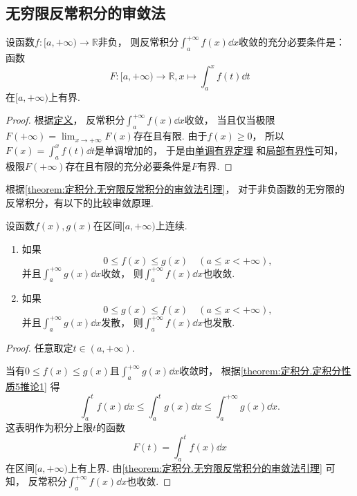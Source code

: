 \subsection{无穷限反常积分的审敛法}
\begin{theorem}\label{theorem:定积分.无穷限反常积分的审敛法引理}
设函数\(f\colon[a,+\infty)\to\mathbb{R}\)非负，
则反常积分\(\int_a^{+\infty} f(x) \dd{x}\)收敛的充分必要条件是：
函数\[
	F\colon[a,+\infty)\to\mathbb{R},
	x \mapsto \int_a^x f(t) \dd{t}
\]在\([a,+\infty)\)上有界.
\begin{proof}
根据\hyperref[definition:定积分.无穷限的反常积分的定义1]{定义}，
反常积分\(\int_a^{+\infty} f(x) \dd{x}\)收敛，
当且仅当极限\(F(+\infty) = \lim_{x\to+\infty} F(x)\)存在且有限.
由于\(f(x)\geq0\)，
所以\(F(x) = \int_a^x f(t) \dd{t}\)是单调增加的，
于是由\hyperref[theorem:极限.函数的单调有界定理]{单调有界定理}%
和\hyperref[theorem:极限.函数极限的局部有界性]{局部有界性}可知，
极限\(F(+\infty)\)存在且有限的充分必要条件是\(F\)有界.
\end{proof}
\end{theorem}

根据\cref{theorem:定积分.无穷限反常积分的审敛法引理}，
对于非负函数的无穷限的反常积分，有以下的比较审敛原理.
\begin{theorem}[比较审敛原理]\label{theorem:定积分.无穷限反常积分的比较审敛原理}
设函数\(f(x),g(x)\)在区间\([a,+\infty)\)上连续.
\begin{enumerate}
	\item 如果\[
		0 \leq f(x) \leq g(x)
		\quad (a \leq x < +\infty),
	\]并且\(\int_a^{+\infty} g(x) \dd{x}\)收敛，
	则\(\int_a^{+\infty} f(x) \dd{x}\)也收敛.

	\item 如果\[
		0 \leq g(x) \leq f(x)
		\quad (a \leq x < +\infty),
	\]
	并且\(\int_a^{+\infty} g(x) \dd{x}\)发散，
	则\(\int_a^{+\infty} f(x) \dd{x}\)也发散.
\end{enumerate}
\begin{proof}
任意取定\(t \in (a,+\infty)\).

当有\(0 \leq f(x) \leq g(x)\)且\(\int_a^{+\infty} g(x) \dd{x}\)收敛时，
根据\cref{theorem:定积分.定积分性质5推论1}
得\[
	\int_a^t f(x) \dd{x}
	\leq
	\int_a^t g(x) \dd{x}
	\leq
	\int_a^{+\infty} g(x) \dd{x}.
\]
这表明作为积分上限\(t\)的函数\[
	F(t) = \int_a^t f(x) \dd{x}
\]
在区间\([a,+\infty)\)上有上界.
由\cref{theorem:定积分.无穷限反常积分的审敛法引理} 可知，
反常积分\(\int_a^{+\infty} f(x) \dd{x}\)也收敛.
\end{proof}
\end{theorem}

